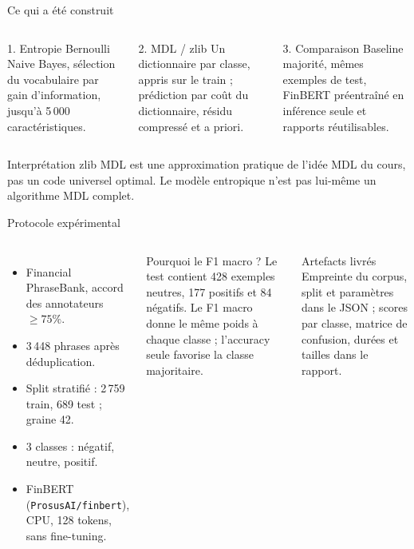 \documentclass[aspectratio=169,10pt]{beamer}
\begin{document}
\begin{frame}{Ce qui a été construit}
  \begin{columns}[T,onlytextwidth]
      \begin{block}{1. Entropie}
        Bernoulli Naive Bayes, sélection du vocabulaire par gain d'information,
        jusqu'à 5\,000 caractéristiques.
      \end{block}
      \begin{block}{2. MDL / zlib}
        Un dictionnaire par classe, appris sur le train ; prédiction par coût
        du dictionnaire, résidu compressé et a priori.
      \end{block}
      \begin{block}{3. Comparaison}
        Baseline majorité, mêmes exemples de test, FinBERT préentraîné en
        inférence seule et rapports réutilisables.
      \end{block}
  \end{columns}
  \vfill
  \begin{alertblock}{Interprétation}
    zlib MDL est une approximation pratique de l'idée MDL du cours, pas un
    code universel optimal. Le modèle entropique n'est pas lui-même un
    algorithme MDL complet.
  \end{alertblock}
\end{frame}

\begin{frame}{Protocole expérimental}
  \begin{columns}[T,onlytextwidth]
      \begin{itemize}
        \item Financial PhraseBank, accord des annotateurs $\geq 75\%$.
        \item 3\,448 phrases après déduplication.
        \item Split stratifié : 2\,759 train, 689 test ; graine 42.
        \item 3 classes : négatif, neutre, positif.
        \item FinBERT (\texttt{ProsusAI/finbert}), CPU, 128 tokens, sans
        fine-tuning.
      \end{itemize}
      \begin{block}{Pourquoi le F1 macro ?}
        Le test contient 428 exemples neutres, 177 positifs et 84 négatifs.
        Le F1 macro donne le même poids à chaque classe ; l'accuracy seule
        favorise la classe majoritaire.
      \end{block}
      \begin{block}{Artefacts livrés}
        Empreinte du corpus, split et paramètres dans le JSON ; scores par
        classe, matrice de confusion, durées et tailles dans le rapport.
      \end{block}
  \end{columns}
\end{frame}
\end{document}

